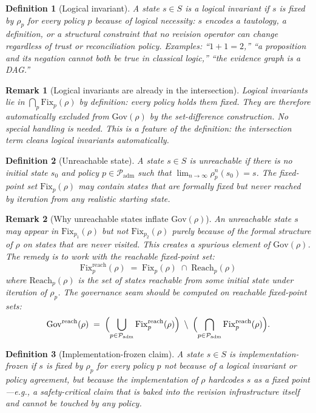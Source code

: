 \documentclass[11pt]{article}
\newtheorem{definition}{Definition}
\newtheorem{remark}{Remark}
\newcommand{\Gov}{\mathrm{Gov}}
\newcommand{\Fix}{\mathrm{Fix}}
\newcommand{\Padm}{\mathcal{P}_{\mathrm{adm}}}
\begin{document}
\begin{definition}[Logical invariant]
\label{def:logical-invariant}
A state $s \in S$ is a \emph{logical invariant} if $s$ is fixed by $\rho_p$ for every policy
$p$ because of logical necessity: $s$ encodes a tautology, a definition, or a structural
constraint that no revision operator can change regardless of trust or reconciliation policy.
Examples: ``$1 + 1 = 2$,'' ``a proposition and its negation cannot both be true in classical
logic,'' ``the evidence graph is a DAG.''
\end{definition}

\begin{remark}[Logical invariants are already in the intersection]
Logical invariants lie in $\bigcap_{p} \Fix_p(\rho)$ by definition: every policy holds them
fixed. They are therefore automatically excluded from $\Gov(\rho)$ by the set-difference
construction. No special handling is needed. This is a feature of the definition: the
intersection term cleans logical invariants automatically.
\end{remark}

\begin{definition}[Unreachable state]
\label{def:unreachable}
A state $s \in S$ is \emph{unreachable} if there is no initial state $s_0$ and policy $p \in
\Padm$ such that $\lim_{n \to \infty} \rho_p^n(s_0) = s$. The fixed-point set $\Fix_p(\rho)$ may
contain states that are formally fixed but never reached by iteration from any realistic
starting state.
\end{definition}

\begin{remark}[Why unreachable states inflate $\Gov(\rho)$]
An unreachable state $s$ may appear in $\Fix_{p_1}(\rho)$ but not $\Fix_{p_2}(\rho)$ purely
because of the formal structure of $\rho$ on states that are never visited. This creates a
spurious element of $\Gov(\rho)$. The remedy is to work with the \emph{reachable fixed-point
set}:
\[
  \Fix_p^{\mathrm{reach}}(\rho) \;=\; \Fix_p(\rho) \;\cap\; \mathrm{Reach}_p(\rho)
\]
where $\mathrm{Reach}_p(\rho)$ is the set of states reachable from some initial state under
iteration of $\rho_p$. The governance seam should be computed on reachable fixed-point sets:
\[
  \Gov^{\mathrm{reach}}(\rho) \;=\; \Bigl(\bigcup_{p \in \Padm} \Fix_p^{\mathrm{reach}}(\rho)\Bigr)
  \;\setminus\; \Bigl(\bigcap_{p \in \Padm} \Fix_p^{\mathrm{reach}}(\rho)\Bigr).
\]
\end{remark}

\begin{definition}[Implementation-frozen claim]
\label{def:impl-frozen}
A state $s \in S$ is \emph{implementation-frozen} if $s$ is fixed by $\rho_p$ for every policy
$p$ not because of a logical invariant or policy agreement, but because the implementation
of $\rho$ hardcodes $s$ as a fixed point---e.g., a safety-critical claim that is baked into the
revision infrastructure itself and cannot be touched by any policy.
\end{definition}
\end{document}
